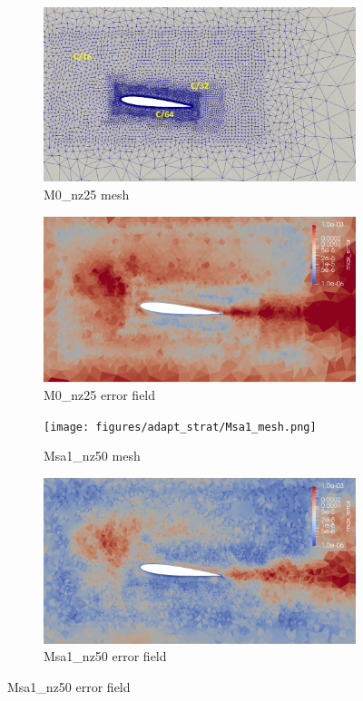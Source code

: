 \begin{figure}[H]
\centering
\begin{subfigure}[b]{0.475\textwidth}
\centering
\includegraphics[width=1\textwidth]{figures/adapt_strat/M0_mesh.png}
\caption{M0\_nz25 mesh}
\label{fig:M0_mesh_sa}
\end{subfigure}
\begin{subfigure}[b]{0.475\textwidth}
\centering
\includegraphics[width=1\textwidth]{figures/adapt_strat/M0_error.png}
\caption{M0\_nz25 error field}
\label{fig:M0_err_plot_sa}
\end{subfigure}
\begin{subfigure}[b]{0.475\textwidth}
\centering
\texttt{[image: figures/adapt\_strat/Msa1\_mesh.png]}
\caption{Msa1\_nz50 mesh}
\label{fig:h_adapt1_mesh}
\end{subfigure}
\begin{subfigure}[b]{0.475\textwidth}
\centering
\includegraphics[width=1\textwidth]{figures/adapt_strat/Msa1_error.png}
\caption{Msa1\_nz50 error field}
\label{fig:h_adapt1_error_plot}
\end{subfigure}


\end{figure}
